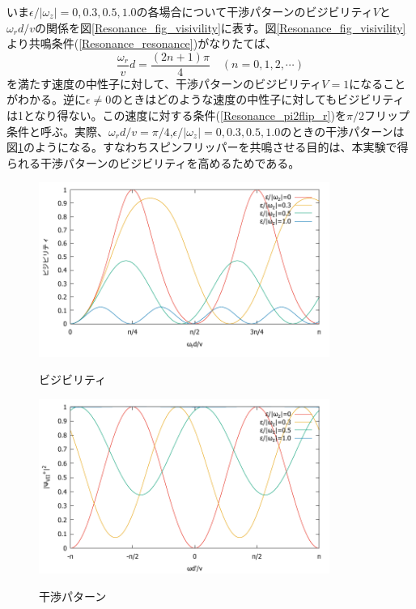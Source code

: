 いま$\epsilon/|\omega_z|=0,0.3,0.5,1.0$の各場合について干渉パターンのビジビリティ$V$と$\omega_r d/v$の関係を図\ref{Resonance_fig_visivility}に表す。図\ref{Resonance_fig_visivility}より共鳴条件(\ref{Resonance_resonance})がなりたてば、
\begin{equation}
\frac{\omega_r }{v}d =\frac{(2n+1)\pi}{4} \quad (n =0,1,2,\cdots) \label{Resonance_pi2flip_r}
\end{equation}
を満たす速度の中性子に対して、干渉パターンのビジビリティ$V=1$になることがわかる。逆に$\epsilon \neq 0$のときはどのような速度の中性子に対してもビジビリティは1となり得ない。この速度に対する条件(\ref{Resonance_pi2flip_r})を$\pi/2$フリップ条件と呼ぶ。実際、$\omega_rd/v=\pi/4$,$\epsilon/|\omega_z|=0,0.3,0.5,1.0$のときの干渉パターンは図\ref{Resonance_fig_interference}のようになる。すなわちスピンフリッパーを共鳴させる目的は、本実験で得られる干渉パターンのビジビリティを高めるためである。

\begin{figure}[h]
\vspace{-2mm}
\begin{center}
\includegraphics[width=9.5cm]{resonance/whatwhyhow/resonance_visivility1.pdf}
\caption{ビジビリティ}
\label{Resonance_fig_visivility}
\includegraphics[width=9.5cm]{resonance/whatwhyhow/resonance_interference1.pdf}
\caption{干渉パターン}
\label{Resonance_fig_interference}
\end{center}
\vspace{-1cm}
\end{figure}



